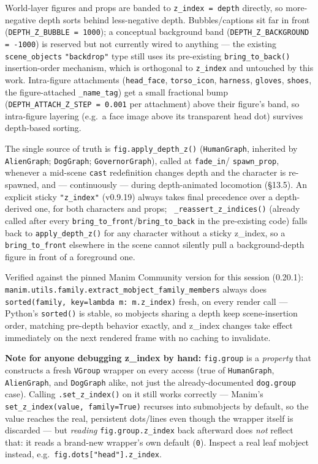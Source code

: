 \documentclass[
  11pt,
]{book}
\begin{document}
World-layer figures and props are banded to \texttt{z\_index = depth}
directly, so more-negative depth sorts behind less-negative depth.
Bubbles/captions sit far in front (\texttt{DEPTH\_Z\_BUBBLE = 1000});
a conceptual background band (\texttt{DEPTH\_Z\_BACKGROUND = -1000})
is reserved but not currently wired to anything --- the existing
\texttt{scene\_objects} \texttt{"backdrop"} type still uses its
pre-existing \texttt{bring\_to\_back()} insertion-order mechanism,
which is orthogonal to \texttt{z\_index} and untouched by this work.
Intra-figure attachments (\texttt{head\_face}, \texttt{torso\_icon},
\texttt{harness}, \texttt{gloves}, \texttt{shoes}, the figure-attached
\texttt{\_name\_tag}) get a small fractional bump
(\texttt{DEPTH\_ATTACH\_Z\_STEP = 0.001} per attachment) above their
figure's band, so intra-figure layering (e.g.\ a face image above its
transparent head dot) survives depth-based sorting.

The single source of truth is \texttt{fig.apply\_depth\_z()}
(\texttt{HumanGraph}, inherited by \texttt{AlienGraph};
\texttt{DogGraph}; \texttt{GovernorGraph}), called at \texttt{fade\_in}/
\texttt{spawn\_prop}, whenever a mid-scene \texttt{cast} redefinition
changes depth and the character is re-spawned, and --- continuously
--- during depth-animated locomotion (\S13.5). An explicit sticky
\texttt{"z\_index"} (v0.9.19) always takes final precedence over a
depth-derived one, for both characters and props; \texttt{
\_reassert\_z\_indices()} (already called after every
\texttt{bring\_to\_front}/\texttt{bring\_to\_back} in the pre-existing
code) falls back to \texttt{apply\_depth\_z()} for any character
without a sticky z\_index, so a \texttt{bring\_to\_front} elsewhere in
the scene cannot silently pull a background-depth figure in front of a
foreground one.

Verified against the pinned Manim Community version for this session
(0.20.1): \texttt{manim.utils.family.extract\_mobject\_family\_members}
always does \texttt{sorted(family, key=lambda m: m.z\_index)} fresh, on
every render call --- Python's \texttt{sorted()} is stable, so
mobjects sharing a depth keep scene-insertion order, matching
pre-depth behavior exactly, and z\_index changes take effect
immediately on the next rendered frame with no caching to invalidate.

\textbf{Note for anyone debugging z\_index by hand:}
\texttt{fig.group} is a \emph{property} that constructs a fresh
\texttt{VGroup} wrapper on every access (true of \texttt{HumanGraph},
\texttt{AlienGraph}, and \texttt{DogGraph} alike, not just the
already-documented \texttt{dog.group} case). Calling
\texttt{.set\_z\_index()} on it still works correctly --- Manim's
\texttt{set\_z\_index(value, family=True)} recurses into submobjects by
default, so the value reaches the real, persistent dots/lines even
though the wrapper itself is discarded --- but \emph{reading}
\texttt{fig.group.z\_index} back afterward does \emph{not} reflect
that: it reads a brand-new wrapper's own default (\texttt{0}). Inspect
a real leaf mobject instead, e.g.\ \texttt{fig.dots["head"].z\_index}.
\end{document}
